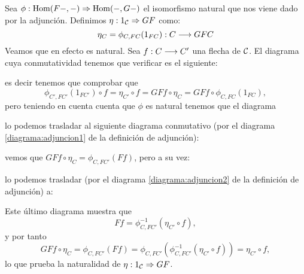 Sea $\phi : \operatorname{Hom}(F-, -)\Rightarrow \operatorname{Hom}(-, G-)$ el isomorfismo natural que
nos viene dado por la adjunción. Definimos $\eta : 1_{\mathcal{C}}\Rightarrow GF$
como:
$$\eta_C = \phi_{C, FC}(1_{FC}) : C\longrightarrow GFC$$
Veamos que en efecto es natural. Sea $f : C\longrightarrow C'$
una flecha de $\mathcal{C}$. El diagrama cuya conmutatividad
tenemos que verificar es el siguiente:
\begin{center}
\end{center}
es decir tenemos que comprobar que
$$\phi_{C', FC'}(1_{FC'}) \circ f = \eta_{C'} \circ f = GFf \circ \eta_C
  = GFf \circ \phi_{C, FC}(1_{FC}),$$
pero teniendo en cuenta cuenta que $\phi$ es natural tenemos que el diagrama
\begin{center}
\end{center}
lo podemos trasladar al siguiente diagrama conmutativo (por el
diagrama \eqref{diagrama:adjuncion1} de la definición de adjunción):
\begin{center}
\end{center}
vemos que $GFf \circ \eta_C = \phi_{C, FC'}(Ff)$, pero a su vez:
\begin{center}
\end{center}
lo podemos trasladar (por el diagrama \eqref{diagrama:adjuncion2}
de la definición de adjunción) a:
\begin{center}
\end{center}
Este último diagrama muestra que
$$Ff = \phi^{-1}_{C, FC'}(\eta_{C'} \circ f),$$
y por tanto
$$GFf \circ \eta_C = \phi_{C, FC'}(Ff) = \phi_{C, FC'}
  (\phi^{-1}_{C,FC'}(\eta_{C'} \circ f)) = \eta_{C'} \circ f,$$
lo que prueba la naturalidad de $\eta : 1_{\mathcal{C}}\Rightarrow GF$.

